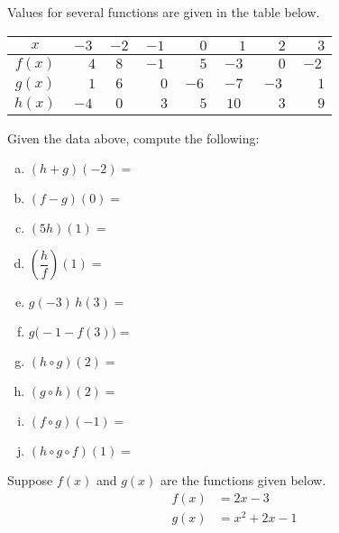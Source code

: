 \documentclass[11pt,letterpaper]{article}
\begin{document}

 Values for several functions are given in the table below. 
        \begin{table}[!ht]
        \centering
        \begin{tabular}{| c || c | c | c | c | c | c | c |} \hline
	$x$ & $-3$ & $-2$ & $-1$ & $\phantom{-}0$ & $\phantom{-}1$ & $\phantom{-}2$ & $\phantom{-}3$ \\ \hline \hline
	$f(x)$ & $\phantom{-}4$ & $8$ & $-1$ & $\phantom{-}5$ & $-3$ & $\phantom{-}0$ & $-2$ \\ \hline
	$g(x)$ & $\phantom{-}1$ & $6$ & $\phantom{-}0$ & $-6$ & $-7$ & $-3$ & $\phantom{-}1$ \\ \hline
	$h(x)$ & $-4$ & $0$ & $\phantom{-}3$ & $\phantom{-}5$ & $10$ & $\phantom{-}3$ & $\phantom{-}9$ \\ \hline
        \end{tabular}
        \end{table}

Given the data above, compute the following: 
        \begin{enumerate}[(a)]
        \item $(h + g)(-2)=$ \vfill
        \item $(f - g)(0)=$ \vfill
        \item $(5h)(1)=$ \vfill
        \item $\left(\dfrac{h}{f}\right)(1)=$ \vfill
        \item $g(-3)\, h(3)=$ \vfill
        \item $g \big(-1 - f(3) \big)=$ \vfill
        \item $(h \circ g)(2)=$ \vfill
	\item $(g \circ h)(2)=$ \vfill
        \item $(f \circ g)(-1)=$ \vfill
	\item $(h \circ g \circ f)(1)=$ \vfill
        \end{enumerate}



\newpage



 Suppose $f(x)$ and $g(x)$ are the functions given below. 
	\[
	\begin{aligned}
	f(x)&= 2x - 3 \\[0.3cm]
	g(x)&= x^2 + 2x - 1
	\end{aligned}
	\]
\end{document}
